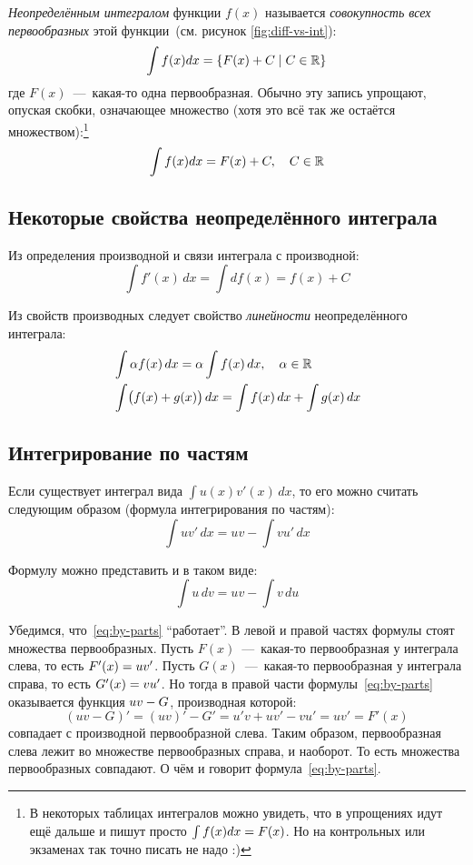 \documentclass[a4paper,12pt]{article}
\begin{document}
  \emph{Неопределённым интегралом} функции $f(x)$ называется \emph{совокупность всех первообразных} этой функции~(см. рисунок \ref{fig:diff-vs-int}):
  \[
    \int f(x) dx = \{F(x) + C \mid C \in \operatorname{\mathbb R}\}
  \]
  где $F(x)$~---~какая-то одна первообразная.
  Обычно эту запись упрощают, опуская скобки, означающее множество (хотя это всё так же остаётся множеством):\footnote{
    В некоторых таблицах интегралов можно увидеть, что в упрощениях идут ещё дальше и пишут просто $\int f(x) dx \hm= F(x)$.
    Но на контрольных или экзаменах так точно писать не надо :)
  }
  \[
    \int f(x) dx = F(x) + C,\quad C \in \operatorname{\mathbb R}
  \]
  
  
  \subsection{Некоторые свойства неопределённого интеграла}
  
  Из определения производной и связи интеграла с производной:
  \[
    \int f'(x)\, dx = \int df(x) = f(x) + C
  \]
  
  Из свойств производных следует свойство \emph{линейности} неопределённого интеграла:
  \[
    \left.
      \begin{aligned}
        &\int \alpha f(x)\, dx = \alpha \int f(x)\, dx,\quad \alpha \in \operatorname{\mathbb R}\\
        &\int \bigl(f(x) + g(x)\bigr)\, dx = \int f(x)\, dx + \int g(x)\, dx
      \end{aligned}
    \right.
  \]
  
  
  \subsection{Интегрирование по частям}
  
  Если существует интеграл вида $\int u(x) v'(x)\, dx$, то его можно считать следующим образом (формула интегрирования по частям):
  \begin{equation}\label{eq:by-parts}
    \int u v'\, dx = u v - \int v u'\, dx
  \end{equation}
  
  Формулу можно представить и в таком виде:
  \begin{equation}
    \int u\, dv = u v - \int v\, du
  \end{equation}
  
  Убедимся, что~\eqref{eq:by-parts} ``работает''.
  В левой и правой частях формулы стоят множества первообразных.
  Пусть $F(x)$~---~какая-то первообразная у интеграла слева, то есть $F'(x) \hm= u v'$.
  Пусть $G(x)$~---~какая-то первообразная у интеграла справа, то есть $G'(x) \hm= vu'$.
  Но тогда в правой части формулы~\eqref{eq:by-parts} оказывается функция $uv \hm- G$, производная которой:
  \[
    (uv - G)' = (uv)' - G' = u'v + uv' - vu' = uv' = F'(x)
  \]
  совпадает с производной первообразной слева.
  Таким образом, первообразная слева лежит во множестве первообразных справа, и наоборот.
  То есть множества первообразных совпадают.
  О чём и говорит формула~\eqref{eq:by-parts}.
  
\end{document}
